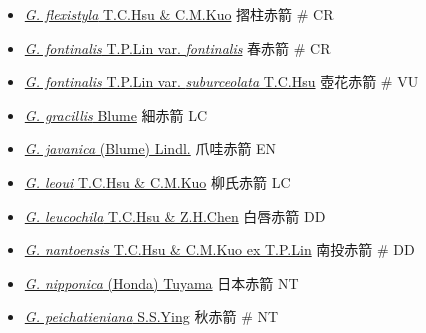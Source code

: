 \begin{itemize}
\begin{itemize}
        \item[] \href{http://www.theplantlist.org/tpl1.1/search?q=Gastrodia+flexistyla}{\textit{G. flexistyla} T.C.Hsu \& C.M.Kuo}   摺柱赤箭  \# CR
        \item[] \href{http://www.theplantlist.org/tpl1.1/search?q=Gastrodia+fontinalis+var.+fontinalis}{\textit{G. fontinalis} T.P.Lin var. \textit{fontinalis}}   春赤箭  \# CR
        \item[] \href{http://www.theplantlist.org/tpl1.1/search?q=Gastrodia+fontinalis+var.+suburceolata}{\textit{G. fontinalis} T.P.Lin var. \textit{suburceolata} T.C.Hsu}   壺花赤箭  \# VU
        \item[] \href{http://www.theplantlist.org/tpl1.1/search?q=Gastrodia+gracillis}{\textit{G. gracillis} Blume}   細赤箭   LC
        \item[] \href{http://www.theplantlist.org/tpl1.1/search?q=Gastrodia+javanica}{\textit{G. javanica} (Blume) Lindl.}   爪哇赤箭   EN
        \item[] \href{http://www.theplantlist.org/tpl1.1/search?q=Gastrodia+leoui}{\textit{G. leoui} T.C.Hsu \& C.M.Kuo}   柳氏赤箭   LC
        \item[] \href{http://www.theplantlist.org/tpl1.1/search?q=Gastrodia+leucochila}{\textit{G. leucochila} T.C.Hsu \& Z.H.Chen}   白唇赤箭   DD
        \item[] \href{http://www.theplantlist.org/tpl1.1/search?q=Gastrodia+nantoensis}{\textit{G. nantoensis} T.C.Hsu \& C.M.Kuo ex T.P.Lin}   南投赤箭  \# DD
        \item[] \href{http://www.theplantlist.org/tpl1.1/search?q=Gastrodia+nipponica}{\textit{G. nipponica} (Honda) Tuyama}   日本赤箭   NT
        \item[] \href{http://www.theplantlist.org/tpl1.1/search?q=Gastrodia+peichatieniana}{\textit{G. peichatieniana} S.S.Ying}   秋赤箭  \# NT

\end{itemize}
\end{itemize}
